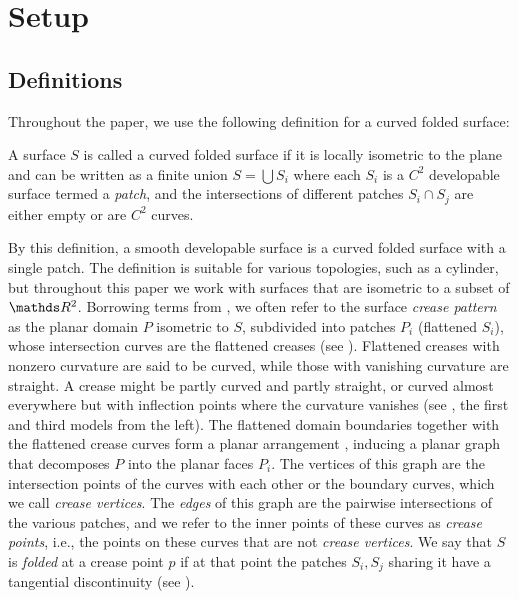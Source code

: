 
\section{Setup} \label{sec:setup}
\subsection{Definitions}
Throughout the paper, we use the following definition for a curved folded surface:
\begin{definition} \label{def:curved_folded_surface}
A surface $S$ is called a curved folded surface if it is locally isometric to the plane and can be written as a finite union $S = \bigcup S_i $ where each $S_i$ is a $C^2$ developable surface termed a \emph{patch}, and the intersections of different patches $S_i \cap S_j$ are either empty or are $C^2$ curves.
\end{definition}
By this definition, a smooth developable surface is a curved folded surface with a single patch.
The definition is suitable for various topologies, such as a cylinder, but throughout this paper we work with surfaces that are isometric to a subset of $\R^2$. Borrowing terms from \cite{origami_book,non_pleated}, we often refer to the surface \emph{crease pattern} as the planar domain $P$ isometric to $S$, subdivided into patches $P_i$ (flattened $S_i$), whose intersection curves are the flattened creases (see ). Flattened creases with nonzero curvature are said to be curved, while those with vanishing curvature are straight. A crease might be partly curved and partly straight, or curved almost everywhere but with inflection points where the curvature vanishes (see , the first and third models from the left). The flattened domain boundaries together with the flattened crease curves form a planar arrangement \cite{arrangements}, inducing a planar graph that decomposes $P$ into the planar faces $P_i$. The vertices of this graph are the intersection points of the curves with each other or the boundary curves, which we call \emph{crease vertices}. The \emph{edges} of this graph are the pairwise intersections of the various patches, and we refer to the inner points of these curves as \emph{crease points}, i.e., the points on these curves that are not \emph{crease vertices}. We say that $S$ is \emph{folded} at a crease point $p$ if at that point the patches $S_i,S_j$ sharing it have a tangential discontinuity (see ).

